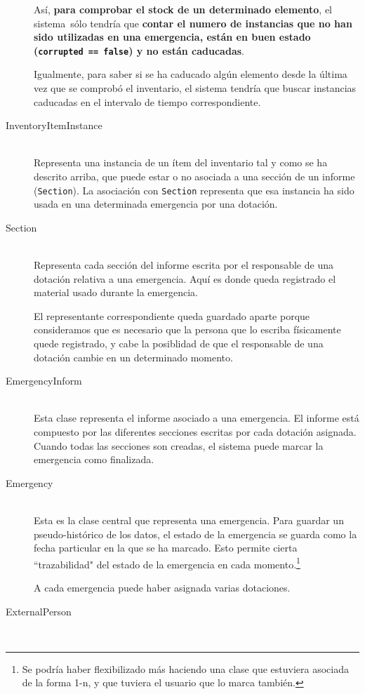 \begin{description}
        Así, \textbf{para comprobar el stock de un determinado elemento}, el sistema sólo tendría que \textbf{contar el numero de instancias que no han sido utilizadas en una emergencia, están en buen estado (\texttt{corrupted == false}) y no están caducadas}. \par
        Igualmente, para saber si se ha caducado algún elemento desde la última vez que se comprobó el inventario, el sistema tendría que buscar instancias caducadas en el intervalo de tiempo correspondiente.
    \item[InventoryItemInstance] \hfill \\
        Representa una instancia de un ítem del inventario tal y como se ha descrito arriba, que puede estar o no asociada a una sección de un informe (\texttt{Section}).
        La asociación con \texttt{Section} representa que esa instancia ha sido usada en una determinada emergencia por una dotación.
    \item[Section] \hfill \\
        Representa cada sección del informe escrita por el responsable de una dotación relativa a una emergencia. Aquí es donde queda registrado el material usado durante la emergencia. \par
        El representante correspondiente queda guardado aparte porque consideramos que es necesario que la persona que lo escriba físicamente quede registrado, y cabe la posiblidad de que el responsable de una dotación cambie en un determinado momento.
    \item[EmergencyInform] \hfill \\
        Esta clase representa el informe asociado a una emergencia. El informe está compuesto por las diferentes secciones escritas por cada dotación asignada. Cuando todas las secciones son creadas, el sistema puede marcar la emergencia como finalizada.
    \item[Emergency] \hfill \\
        Esta es la clase central que representa una emergencia. Para guardar un pseudo-histórico de los datos, el estado de la emergencia se guarda como la fecha particular en la que se ha marcado. Esto permite cierta ``trazabilidad" del estado de la emergencia en cada momento.\footnote{Se podría haber flexibilizado más haciendo una clase que estuviera asociada de la forma 1-n, y que tuviera el usuario que lo marca también.} \par
        A cada emergencia puede haber asignada varias dotaciones.
    \item[ExternalPerson] \hfill \\

\end{description}
